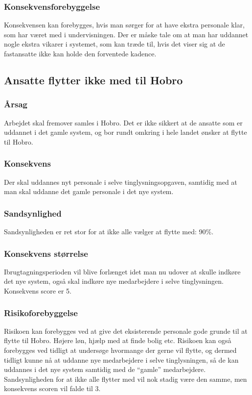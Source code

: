 \documentclass[10pt,a4paper,danish]{article}
\begin{document}
\subsubsection{Konsekvensforebyggelse}
Konsekvensen kan forebygges, hvis man sørger for at have ekstra personale klar, som har været med i undervisningen. Der er måske tale om at man har uddannet nogle ekstra vikarer i systemet, som kan træde til, hvis det viser sig at de fastansatte ikke kan holde den forventede kadence.


\subsection{Ansatte flytter ikke med til Hobro}
\subsubsection{Årsag}
Arbejdet skal fremover samles i Hobro. Det er ikke sikkert at de ansatte som er uddannet i det gamle system, og bor rundt omkring i hele landet ønsker at flytte til Hobro.

\subsubsection{Konsekvens}
Der skal uddannes nyt personale i selve tinglysningsopgaven, samtidig med at man skal uddanne det gamle personale i det nye system.

\subsubsection{Sandsynlighed}
Sandsynligheden er ret stor for at ikke alle vælger at flytte med: 90\%.

\subsubsection{Konsekvens størrelse}
Ibrugtagningsperioden vil blive forlænget idet man nu udover at skulle indkøre det nye system, også skal indkøre nye medarbejdere i selve tinglysningen. Konsekvens score er 5.

\subsubsection{Risikoforebyggelse}
Risikoen kan forebygges ved at give det eksisterende personale gode grunde til at flytte til Hobro. Højere løn, hjælp med at finde bolig etc. Risikoen kan også forebygges ved tidligt at undersøge hvormange der gerne vil flytte, og dermed tidligt kunne nå at uddanne nye medarbejdere i selve tinglysningen, så de kan uddannes i det nye system samtidig med de "`gamle"' medarbejdere. Sandsynligheden for at ikke alle flytter med vil nok stadig være den samme, men konsekvens scoren vil falde til 3.
\end{document}
